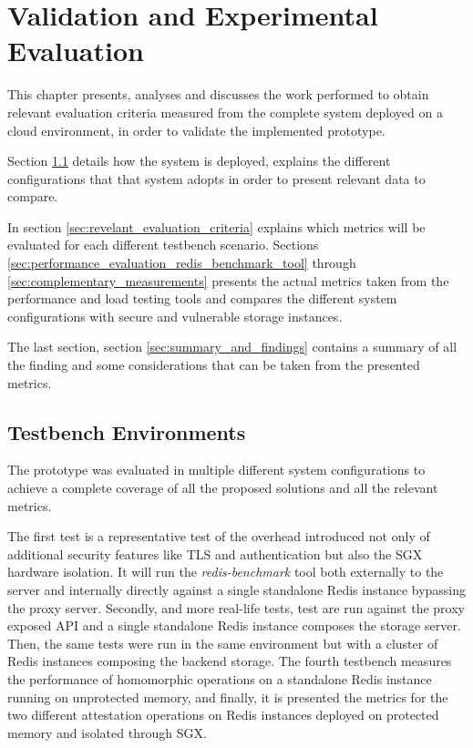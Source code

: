 
\chapter{Validation and Experimental Evaluation}
\label{cha:validation_experimental_Evaluation}

This chapter presents, analyses and discusses the work performed to obtain relevant evaluation criteria measured from the complete system deployed on a cloud environment, in order to validate the implemented prototype.

Section \ref{sec:testbench_environment} details how the system is deployed, explains the different configurations that that system adopts in order to present relevant data to compare.

In section \ref{sec:revelant_evaluation_criteria} explains which metrics will be evaluated for each different testbench scenario. Sections \ref{sec:performance_evaluation_redis_benchmark_tool} through \ref{sec:complementary_measurements} presents the actual metrics taken from the performance and load testing tools and compares the different system configurations with secure and vulnerable storage instances.

The last section, section \ref{sec:summary_and_findings} contains a summary of all the finding and some considerations that can be taken from the presented metrics.

\section{Testbench Environments}
\label{sec:testbench_environment}

The prototype was evaluated in multiple different system configurations to achieve a complete coverage of all the proposed solutions and all the relevant metrics. 

The first test is a representative test of the overhead introduced not only of additional security features like \gls{TLS} and authentication but also the \gls{SGX} hardware isolation. It will run the \textit{redis-benchmark} tool both externally to the server and internally directly against a single standalone Redis instance bypassing the proxy server. Secondly, and more real-life tests, test are run against the proxy exposed \gls{API} and a single standalone Redis instance composes the storage server. Then, the same tests were run in the same environment but with a cluster of Redis instances composing the backend storage. The fourth testbench measures the performance of homomorphic operations on a standalone Redis instance running on unprotected memory, and finally, it is presented the metrics for the two different attestation operations on Redis instances deployed on protected memory and isolated through \gls{SGX}.

